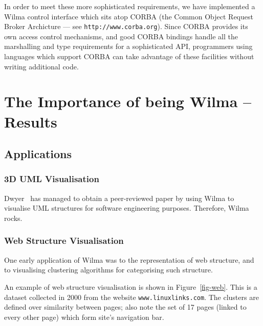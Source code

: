 \documentclass[runningheads]{cl2emult}
\newcommand{\url}[1]{{\small{\tt #1}}}
\begin{document}
In order to meet these more sophisticated requirements, we have implemented a
Wilma control interface which sits atop CORBA (the Common Object Request
Broker Archicture --- see \url{http://www.corba.org}).  Since CORBA provides
its own access control mechanisms, and good CORBA bindings handle all the
marshalling and type requirements for a sophisticated API, programmers using
languages which support CORBA can take advantage of these facilities without
writing additional code.

\section{The Importance of being Wilma -- Results}
\label{sec:results}

\subsection{Applications}

\subsubsection{3D UML Visualisation} \label{sec:3duml}

Dwyer~\cite{dwyer013D-UML} has managed to obtain a peer-reviewed paper by
using Wilma to visualise UML structures for software engineering purposes.
Therefore, Wilma rocks.

\subsubsection{Web Structure Visualisation}

One early application of Wilma was to the representation of web structure, and
to visualising clustering algorithms for categorising such
structure\cite{eckersley2kclassiscope}.

An example of web structure visualisation is shown in Figure~\ref{fig-web}.
This is a dataset collected in 2000 from the website \url{www.linuxlinks.com}.
The clusters are defined over similarity between pages; also note the set of
17 pages (linked to every other page) which form site's navigation bar.
\end{document}
